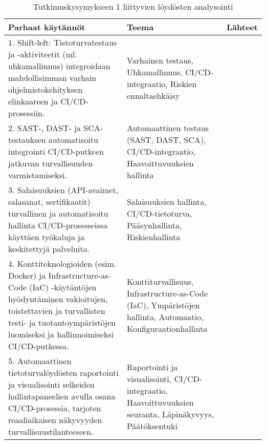 \documentclass[bscthesis,finnish,oneside,biblatex]{uefcsthesis}
\begin{document}
    \begin{table}[htbp]
        \centering
        \footnotesize
        \caption{Tutkimuskysymykseen 1 liittyvien löydösten analysointi}
        \label{tab:rq1-findings}
        \begin{tabular}{p{6.5cm}p{4cm}p{3cm}}
            \toprule
            \textbf{Parhaat käytännöt}                                                                                                                                                                                                                               & \textbf{Teema}                                                                                              & \textbf{Lähteet}                                                                                          \\
            \midrule
            1. Shift-left: Tietoturvatestaus ja -aktiviteetit (ml. uhkamallinnus) integroidaan mahdollisimman varhain ohjelmistokehityksen elinkaareen ja CI/CD-prosessiin. & Varhainen testaus, Uhkamallinnus, CI/CD-integraatio, Riskien ennaltaehkäisy & \cite{kushwaha2024_cct, feio2024_empirical, nikolov2024_fit} \\
            \midrule
            2. SAST-, DAST- ja SCA-testauksen automatisoitu integrointi CI/CD-putkeen jatkuvan turvallisuuden varmistamiseksi. & Automaattinen testaus (SAST, DAST, SCA), CI/CD-integraatio, Haavoittuvuuksien hallinta & \cite{kushwaha2024_cct, feio2024_empirical, marandi2023_ias} \\
            \midrule
            3. Salaisuuksien (API-avaimet, salasanat, sertifikaatit) turvallinen ja automatisoitu hallinta CI/CD-prosesseissa käyttäen työkaluja ja keskitettyjä palveluita. & Salaisuuksien hallinta, CI/CD-tietoturva, Pääsynhallinta, Riskienhallinta & \cite{aljohani2023_automating, byman2024continuous} \\
            \midrule
            4. Konttiteknologioiden (esim. Docker) ja Infrastructure-as-Code (IaC) -käytäntöjen hyödyntäminen vakioitujen, toistettavien ja turvallisten testi- ja tuotantoympäristöjen luomiseksi ja hallinnoimiseksi CI/CD-putkessa. & Konttiturvallisuus, Infrastructure-as-Code (IaC), Ympäristöjen hallinta, Automaatio, Konfiguraationhallinta & \cite{kushwaha2024_cct, feio2024_empirical, marandi2023_ias, putra2022_devsecops} \\
            \midrule
            5. Automaattinen tietoturvalöydösten raportointi ja visualisointi selkeiden hallintapaneelien avulla osana CI/CD-prosessia, tarjoten reaaliaikaisen näkyvyyden turvallisuustilanteeseen. & Raportointi ja visualisointi, CI/CD-integraatio, Haavoittuvuuksien seuranta, Läpinäkyvyys, Päätöksentuki & \cite{aljohani2023_automating, marandi2023_ias} \\

\end{tabular}
\end{table}
\end{document}
